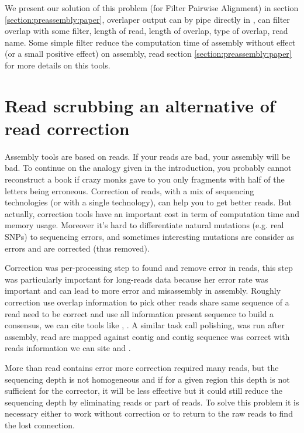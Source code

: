 \documentclass[main.tex]{subfiles}
\begin{document}
We present our solution of this problem \fpa (for Filter Pairwise Alignment) in section \ref{section:preassembly:paper}, overlaper output can by pipe directly in \fpa , \fpa can filter overlap with some filter, length of read, length of overlap, type of overlap, read name. Some simple \fpa filter reduce the computation time of assembly without effect (or a small positive effect) on assembly, read section \ref{section:preassembly:paper} for more details on this tools.


\section{Read scrubbing an alternative of read correction} \label{sec:preasm:intro_yacrd}

Assembly tools are based on reads. If your reads are bad, your assembly will be bad. To continue on the analogy given in the introduction, you probably cannot reconstruct a book if crazy monks gave to you only fragments with half of the letters being erroneous. Correction of reads, with a mix of sequencing technologies (or with a single technology), can help you to get better reads. But actually, correction tools have an important cost in term of computation time and memory usage. Moreover it's hard to differentiate natural mutations (e.g. real SNPs) to sequencing errors, and sometimes interesting mutations are consider as errors and are corrected (thus removed).

Correction was per-processing step to found and remove error in reads, this step was particularly important for long-reads data because her error rate was important and can lead to more error and misassembly in assembly. Roughly correction use overlap information to pick other reads share same sequence of a read need to be correct and use all information present sequence to build a consensus, we can cite tools like \cite{MECAT}, \cite{CONSENT}. A similar task call polishing, was run after assembly, read are mapped against contig and contig sequence was correct with reads information we can site \cite{racon} and .

More than read contains error more correction required many reads, but the sequencing depth is not homogeneous and if for a given region this depth is not sufficient for the corrector, it will be less effective but it could still reduce the sequencing depth by eliminating reads or part of reads. To solve this problem it is necessary either to work without correction or to return to the raw reads to find the lost connection.
\end{document}
